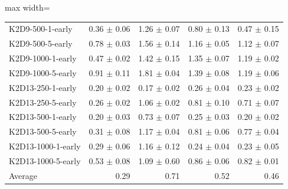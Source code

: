 \documentclass{article}
\begin{document}
\begin{table}[ht]
\begin{center}
\begin{small}
\begin{adjustbox}{max width=\columnwidth}
\begin{tabular}{l|rrrr}
K2D9-500-1-early & 0.36 $\pm$ 0.06 & 1.26 $\pm$ 0.07 & 0.80 $\pm$ 0.13 & 0.47 $\pm$ 0.15\\
K2D9-500-5-early & 0.78 $\pm$ 0.03 & 1.56 $\pm$ 0.14 & 1.16 $\pm$ 0.05 & 1.12 $\pm$ 0.07\\
K2D9-1000-1-early & 0.47 $\pm$ 0.02 & 1.42 $\pm$ 0.15 & 1.35 $\pm$ 0.07 & 1.19 $\pm$ 0.02\\
K2D9-1000-5-early & 0.91 $\pm$ 0.11 & 1.81 $\pm$ 0.04 & 1.39 $\pm$ 0.08 & 1.19 $\pm$ 0.06\\
K2D13-250-1-early & 0.20 $\pm$ 0.02 & 0.17 $\pm$ 0.02 & 0.26 $\pm$ 0.04 & 0.23 $\pm$ 0.02\\
K2D13-250-5-early & 0.26 $\pm$ 0.02 & 1.06 $\pm$ 0.02 & 0.81 $\pm$ 0.10 & 0.71 $\pm$ 0.07\\
K2D13-500-1-early & 0.20 $\pm$ 0.03 & 0.73 $\pm$ 0.07 & 0.25 $\pm$ 0.03 & 0.20 $\pm$ 0.02\\
K2D13-500-5-early & 0.31 $\pm$ 0.08 & 1.17 $\pm$ 0.04 & 0.81 $\pm$ 0.06 & 0.77 $\pm$ 0.04\\
K2D13-1000-1-early & 0.29 $\pm$ 0.06 & 1.16 $\pm$ 0.12 & 0.24 $\pm$ 0.04 & 0.23 $\pm$ 0.05\\
K2D13-1000-5-early & 0.53 $\pm$ 0.08 & 1.09 $\pm$ 0.60 & 0.86 $\pm$ 0.06 & 0.82 $\pm$ 0.01\\
\midrule
Average & 0.29 & 0.71 & 0.52 & 0.46\\
\end{tabular}
        \end{adjustbox}
    \end{small}
    \end{center}
    \vskip -0.1in
\end{table}
\end{document}
